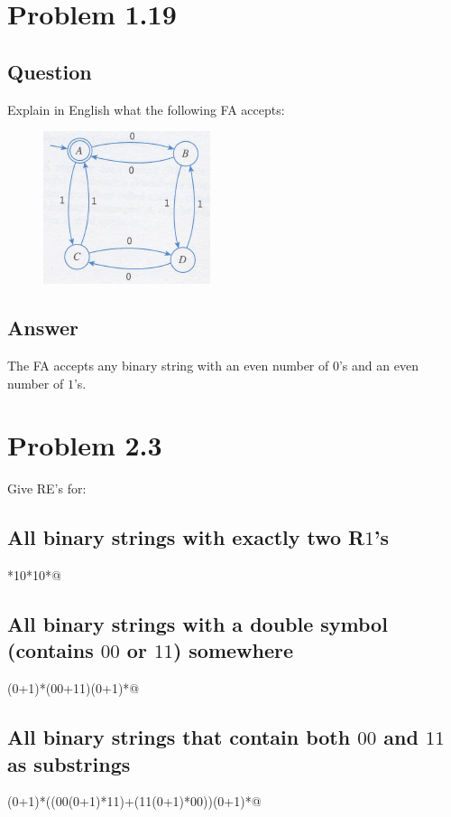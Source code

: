 \documentclass[12pt, a4paper]{article}
\begin{document}
\section{Problem 1.19}
\subsection{Question}
Explain in English what the following FA accepts:
\begin{figure}[H]
\includegraphics[scale=1]{1.19-problem}
\end{figure}
\subsection{Answer}
The FA accepts any binary string with an even number of $0$'s and an even number of $1$'s.

\section{Problem 2.3}
Give RE's for:
\subsection{All binary strings with exactly two R$1$'s}
\begin{center}
*10*10*@
\end{center}
\subsection{All binary strings with a double symbol (contains $00$ or $11$) somewhere}
\begin{center}
\verb@(0+1)*(00+11)(0+1)*@
\end{center}
\subsection{All binary strings that contain both $00$ and $11$ as substrings}
\begin{center}
\verb@(0+1)*((00(0+1)*11)+(11(0+1)*00))(0+1)*@
\end{center}
\end{document}
